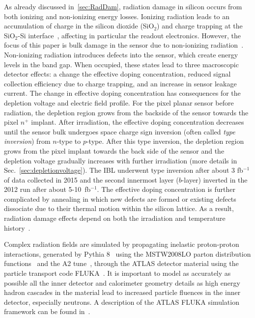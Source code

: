 As already discussed in~\ref{sec:RadDam}, radiation damage in silicon occurs from both ionizing and 
non-ionizing energy losses. Ionizing radiation leads to an accumulation of charge in the silicon dioxide 
(SiO$_2$) and charge trapping at the SiO$_2$-Si interface~\cite{Oldham}, affecting in particular the 
readout electronics. However, the focus of this paper is bulk damage in the sensor due to non-ionizing 
radiation~\cite{moll-thesis}.   Non-ionizing radiation introduces defects into the sensor, which create 
energy levels in the band gap.  When occupied, these states lead to three macroscopic detector effects: 
a change the effective doping concentration, reduced signal collection efficiency due to charge trapping, 
and an increase in sensor leakage current. The change in effective doping concentration has 
consequences for the depletion voltage and electric field profile. For the pixel planar sensor before 
radiation, the depletion region grows from the backside of the sensor towards the pixel $n^+$ implant. 
After irradiation, the effective doping concentration decreases until the sensor bulk undergoes space 
charge sign inversion (often called \textit{type inversion}) from $n$-type to $p$-type. After this type 
inversion, the depletion region grows from the pixel implant towards the back side of the sensor and the 
depletion voltage gradually increases with further irradiation (more details in 
Sec.~\ref{sec:depletionvoltage}). The IBL underwent type inversion after about 3 fb$^{-1}$ of data 
collected in 2015 and the second innermost layer ($b$-layer) inverted in the 2012 run after about 
5-10~fb$^{-1}$. The effective doping concentration is further complicated by annealing in which new 
defects are formed or existing defects dissociate due to their thermal motion within the silicon lattice. As 
a result, radiation damage effects depend on both the irradiation and temperature 
history~\cite{moll-thesis}. 

 Complex radiation fields are simulated by 
propagating inelastic proton-proton interactions, generated by 
Pythia 8~\cite{Sjostrand:2006za,Sjostrand:2014zea} using the MSTW2008LO parton distribution 
functions~\cite{Martin:2009iq} and the A2 tune~\cite{ATLAS:2012uec}, through the ATLAS detector 
material using the particle transport code FLUKA~\cite{Battistoni:2007zzb,Ferrari:898301}. It is 
important to model as accurately as possible all the inner detector and calorimeter geometry details as 
high energy hadron cascades in the material lead to increased particle fluences in the inner detector, 
especially neutrons. A description of the ATLAS FLUKA simulation framework can be found 
in~\cite{Baranov:814823}.

